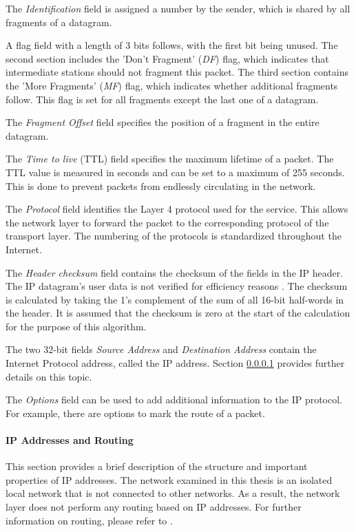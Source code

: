 The \textit{Identification} field is assigned a number by the sender, which is shared by all fragments of a datagram.

A flag field with a length of 3 bits follows, with the first bit being unused. The second section includes the 'Don't Fragment' (\textit{DF}) flag, which indicates that intermediate stations should not fragment this packet. The third section contains the 'More Fragments' (\textit{MF}) flag, which indicates whether additional fragments follow. This flag is set for all fragments except the last one of a datagram.

The \textit{Fragment Offset} field specifies the position of a fragment in the entire datagram.

The \textit{Time to live} (TTL) field specifies the maximum lifetime of a packet. The TTL value is measured in seconds and can be set to a maximum of 255 seconds. This is done to prevent packets from endlessly circulating in the network.

The \textit{Protocol} field identifies the Layer 4 protocol used for the service. This allows the network layer to forward the packet to the corresponding protocol of the transport layer. The numbering of the protocols is standardized throughout the Internet.

The \textit{Header checksum} field contains the checksum of the fields in the IP header. The IP datagram's user data is not verified for efficiency reasons \cite{Holtkamp2024Internet}. The checksum is calculated by taking the 1's complement of the sum of all 16-bit half-words in the header. It is assumed that the checksum is zero at the start of the calculation for the purpose of this algorithm.

The two 32-bit fields \textit{Source Address} and \textit{Destination Address} contain the Internet Protocol address, called the IP address. Section \ref{chap:IPandRouting} provides further details on this topic.

The \textit{Options} field can be used to add additional information to the IP protocol. For example, there are options to mark the route of a packet.


\paragraph{IP Addresses and Routing} \label{chap:IPandRouting}

This section provides a brief description of the structure and important properties of IP addresses. The network examined in this thesis is an isolated local network that is not connected to other networks. As a result, the network layer does not perform any routing based on IP addresses. For further information on routing, please refer to \cite{Tanenbaum2010}.

